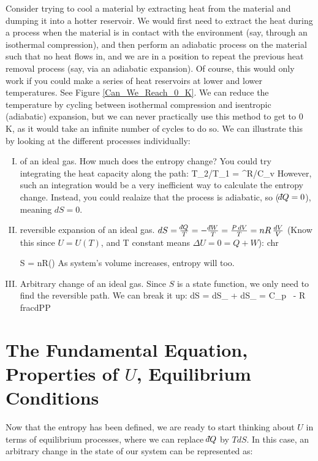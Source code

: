 \documentclass[12pt]{article}
\def\dbar{{\mathchar'26\mkern-12mu d}}
\begin{document}
Consider trying to cool a material by extracting heat from the material and dumping it into a hotter reservoir. %
We would first need to extract the heat during a process when the material is in contact with the environment (say, through an isothermal compression), and then perform an adiabatic process on the material such that no heat flows in, and we are in a position to repeat the previous heat removal process (say, via an adiabatic expansion).  Of course, this would only work if you could make a series of heat reservoirs at lower and lower temperatures. See Figure \ref{Can_We_Reach_0_K}.  We can reduce the temperature by cycling between isothermal compression and isentropic (adiabatic) expansion, but we can never practically use this method to get to 0 K, as it would take an infinite number of cycles to do so. We can illustrate this by looking at the different processes individually:
\begin{enumerate}[(I)]
\item {} of an ideal gas.  How much does the entropy change? You could try integrating the heat capacity along the path:
\beq T_2/T_1 = ^{R/C_v} \ceq
However, such an integration would be a very inefficient way to calculate the entropy change. Instead, you could realaize that the process is adiabatic, so ($\dbar Q = 0$), meaning $d S = 0$.
\item {} reversible expansion of an ideal gas.  $dS = \frac{\dbar Q}{T} = -\frac{\dbar W}{T} = \frac{P\, dV}{T} = nR \, \frac{dV}{V}$ (Know this since $U=U(T)$, and T constant means $\Delta U = 0 = Q + W$): chr

\beq 
\Delta S = nR\ln\left(\right) 
\ceq
As system's volume increases, entropy will too.
\item Arbitrary change of an ideal gas.  Since $S$ is a state function, we only need to find the reversible path.  We can break it up:
\beq dS = dS_ + dS_ = C_p \,  - R \, frac{dP}{P} \ceq

\end{enumerate}

\section{The Fundamental Equation, Properties of $U$, Equilibrium Conditions}
Now that the entropy has been defined, we are ready to start thinking about $U$ in terms of equilibrium processes, where we can replace $\dbar Q$ by $TdS$. In this case, an arbitrary change in the state of our system can be represented as:
\end{document}
